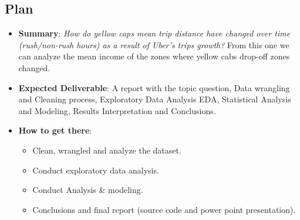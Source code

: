 \documentclass[11pt]{article}
\begin{document}
\subsection{Plan}
\begin{itemize}
\item \textbf{Summary}: \textit{How do yellow caps mean trip distance have changed over time (rush/non-rush hours) as a result of Uber's trips growth?}  From this one we can analyze the mean income of the zones where yellow cabs drop-off zones changed.


\item \textbf{Expected Deliverable}: A report with the topic question, Data wrangling and Cleaning process, Exploratory Data Analysis EDA, Statistical Analysis and Modeling, Results Interpretation and Conclusions.

\item \textbf{How to get there}: 
\begin{itemize}
\item Clean, wrangled and analyze the dataset.
\item Conduct exploratory data analysis.
\item Conduct Analysis \& modeling.
\item Conclusions and final report (source code and power point presentation).
\end{itemize}

\end{itemize}



%
%
%
\end{document}
